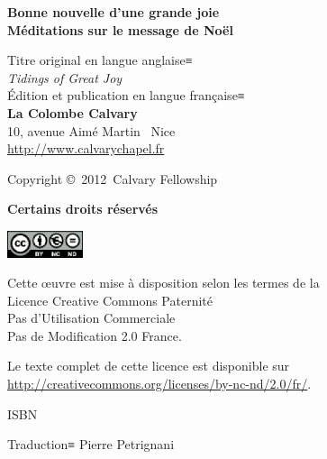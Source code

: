 \newpage
\mbox{}
\vfill

{\scriptsize

\textbf{Bonne nouvelle d'une grande joie\\
 Méditations sur le message de No\"el}

Titre original en langue anglaise≡\\
\emph{Tidings of Great Joy} \\

Édition et publication en langue fran\c{c}aise≡\\
 {\bfseries La Colombe Calvary}\\
 10, avenue Aimé Martin ~Nice\\
 \url{http://www.calvarychapel.fr}

Copyright \copyright{}~2012~Calvary Fellowship

{\bfseries Certains droits réservés}

\includegraphics[width=6em]{by-nc-nd_eu}

Cette \oe{}uvre est mise à disposition selon les termes de la \\
 Licence Creative Commons Paternité \\
 \ocadr Pas d'Utilisation Commerciale \\
 \ocadr Pas de Modification 2.0 France.

Le texte complet de cette licence est disponible sur \\
 \url{http://creativecommons.org/licenses/by-nc-nd/2.0/fr/}.

ISBN~\isbn

Traduction≡ Pierre Petrignani


}

